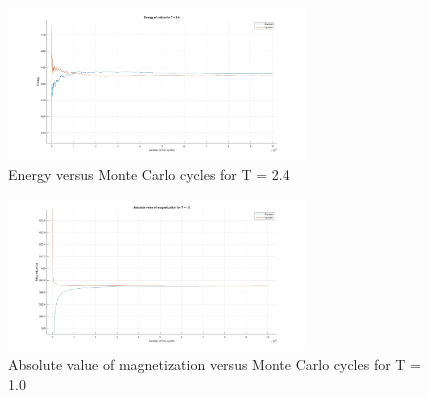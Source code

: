 \documentclass[10pt,a4paper]{article}
\begin{document}
\begin{figure}[H]
\centerline{
\includegraphics[width=0.7\textwidth]{energy24T}
}
\caption{Energy versus Monte Carlo cycles for T = 2.4}
\label{fig:energy24T}
\end{figure}

\begin{figure}[H]
\centerline{
\includegraphics[width=0.7\textwidth]{absmag1T}
}
\caption{Absolute value of magnetization versus Monte Carlo cycles for T = 1.0}
\label{fig:absmag1T}
\end{figure}
\end{document}
